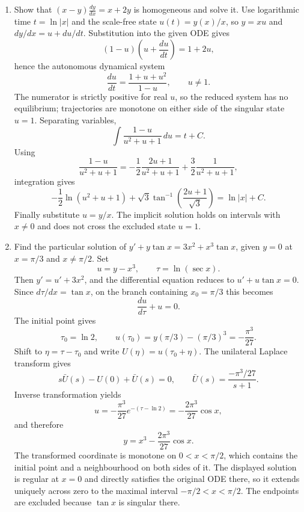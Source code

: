 \begin{enumerate}[label=\theenumi,leftmargin=4mm,itemsep=9pt]
\paragraph*{Differential equations}
\setcounter{enumi}{21}\item Show that $(x-y)\frac{dy}{dx}=x+2y$ is homogeneous and solve it.
\solution Use logarithmic time \(t=\ln|x|\) and the scale-free state
\(u(t)=y(x)/x\), so \(y=xu\) and \(dy/dx=u+du/dt\). Substitution
into the given ODE gives
\[
(1-u)\left(u+\frac{du}{dt}\right)=1+2u,
\]
hence the autonomous dynamical system
\[
\frac{du}{dt}=\frac{1+u+u^2}{1-u},\qquad u\ne1.
\]
The numerator is strictly positive for real \(u\), so the reduced
system has no equilibrium; trajectories are monotone on either side
of the singular state \(u=1\). Separating variables,
\[
\int\frac{1-u}{u^2+u+1}\,du=t+C.
\]
Using
\[
\frac{1-u}{u^2+u+1}
=-\frac12\frac{2u+1}{u^2+u+1}
+\frac32\frac1{u^2+u+1},
\]
integration gives
\[
-\frac12\ln(u^2+u+1)
+\sqrt3\tan^{-1}\!\left(\frac{2u+1}{\sqrt3}\right)
=\ln|x|+C.
\]
Finally substitute \(u=y/x\). The implicit solution holds on
intervals with \(x\ne0\) and does not cross the excluded state \(u=1\).

\setcounter{enumi}{23}\item Find the particular solution of $y'+y\tan x=3x^2+x^3\tan x$, given $y=0$ at $x=\pi/3$ and $x\ne\pi/2$.
\solution Set
\[
u=y-x^3,\qquad \tau=\ln(\sec x).
\]
Then \(y'=u'+3x^2\), and the differential equation reduces to
\(u'+u\tan x=0\). Since \(d\tau/dx=\tan x\), on the branch
containing \(x_0=\pi/3\) this becomes
\[
\frac{du}{d\tau}+u=0.
\]
The initial point gives
\[
\tau_0=\ln2,\qquad
u(\tau_0)=y(\pi/3)-(\pi/3)^3=-\frac{\pi^3}{27}.
\]
Shift to \(\eta=\tau-\tau_0\) and write \(U(\eta)=u(\tau_0+\eta)\).
The unilateral Laplace transform gives
\[
s\bar U(s)-U(0)+\bar U(s)=0,\qquad
\bar U(s)=\frac{-\pi^3/27}{s+1}.
\]
Inverse transformation yields
\[
u=-\frac{\pi^3}{27}e^{-(\tau-\ln2)}
=-\frac{2\pi^3}{27}\cos x,
\]
and therefore
\[
\boxed{y=x^3-\frac{2\pi^3}{27}\cos x}.
\]
The transformed coordinate is monotone on \(0<x<\pi/2\), which
contains the initial point and a neighbourhood on both sides of it.
The displayed solution is regular at \(x=0\) and directly satisfies
the original ODE there, so it extends uniquely across zero to the
maximal interval \(-\pi/2<x<\pi/2\). The endpoints are excluded
because \(\tan x\) is singular there.


\end{enumerate}
